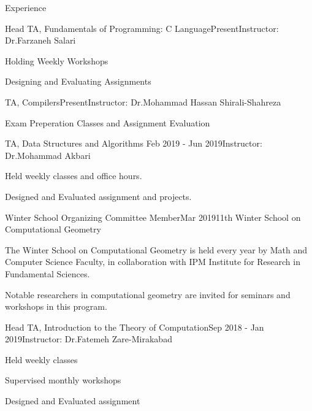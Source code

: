 \documentclass{resume} %
\begin{document}
	\begin{rSection}{Experience}
		\begin{rSubsection}{Head TA, Fundamentals of Programming: C Language}{Present}{Instructor: Dr.Farzaneh Salari}{ }
		\item Holding Weekly Workshops
		\item Designing and Evaluating Assignments
		
		\end{rSubsection}					%
		\begin{rSubsection}{TA, Compilers}{Present}{Instructor: Dr.Mohammad Hassan Shirali-Shahreza}{ }
		\item Exam Preperation Classes and Assignment Evaluation
		\end{rSubsection}					%
		\begin{rSubsection}{TA, Data Structures and Algorithms }{Feb 2019 - Jun 2019}{Instructor: Dr.Mohammad Akbari}{ }
			\item 
			Held weekly classes and office hours.
			\item 
			Designed and Evaluated assignment and projects.
		\end{rSubsection}
		\begin{rSubsection}{Winter School Organizing Committee Member}{Mar 2019}{11th Winter School on Computational Geometry}{ }
			\item 	The Winter School on Computational Geometry is held every year by Math and Computer Science Faculty, in collaboration with IPM Institute for Research in Fundamental Sciences.
			\item Notable researchers in computational geometry are invited for seminars and workshops in this program.
		\end{rSubsection}
		
		
		
		\begin{rSubsection}{Head TA, Introduction to the Theory of Computation}{Sep 2018 - Jan 2019}{Instructor: Dr.Fatemeh Zare-Mirakabad}{ }
			\item Held weekly classes 
			\item Supervised monthly workshops
			\item Designed and Evaluated assignment 
			

\end{rSubsection}
\end{rSection}
\end{document}
